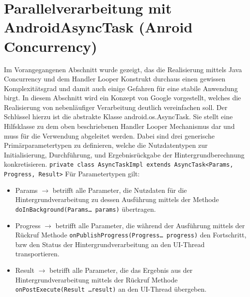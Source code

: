 \documentclass[12pt,oneside,a4paper,bibtotoc,liststotoc]{scrreprt}
\begin{document}
\section{Parallelverarbeitung mit AndroidAsyncTask (Anroid Concurrency)}
Im Vorangegangenen Abschnitt wurde gezeigt, das die Realisierung mittels Java Concurrency und dem Handler Looper Konstrukt durchaus einen gewissen Komplexitätsgrad und damit auch einige Gefahren für eine stabile Anwendung birgt. In diesem Abschnitt wird ein Konzept von Google vorgestellt, welches die Realisierung von nebenläufiger Verarbeitung deutlich vereinfachen soll. Der Schlüssel hierzu ist die abstrakte Klasse android.os.AsyncTask. Sie stellt eine Hilfsklasse zu dem oben beschriebenen Handler Looper Mechanismus dar und muss für die Verwendung abgeleitet werden. Dabei sind drei generische Primärparametertypen zu definieren, welche die  Nutzdatentypen zur Initialisierung, Durchführung, und Ergebnisrückgabe der Hintergrundberechnung konkretisieren.\newline
\newline
\texttt{private class AsyncTaskImpl extends AsyncTask<Params, Progress, Result>}
\newline
Für Parametertypen gilt:
\begin{itemize}
\item Params $\rightarrow$ betrifft alle Parameter, die Nutzdaten für die Hintergrundverarbeitung zu dessen Ausführung mittels der Methode \texttt{doInBackground(Params… params)} übertragen.
\item Progress $\rightarrow$ betrifft alle Parameter, die während der Ausführung mittels der Rückruf Methode \texttt{onPublishProgress(Progress… progress)} den Fortschritt, bzw  den Status der Hintergrundverarbeitung an den UI-Thread transportieren.
\item Result $\rightarrow$ betrifft alle Parameter, die das Ergebnis aus der Hintergrundverarbeitung mittels der Rückruf Methode \texttt{onPostExecute(Result …result)} an den UI-Thread übergeben.
\end{itemize}
\end{document}
